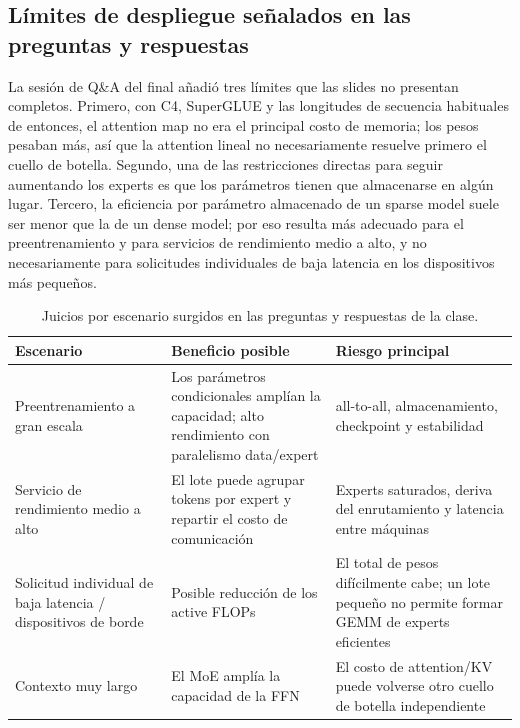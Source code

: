\documentclass[a4paper]{article}
\begin{document}
\subsection{Límites de despliegue señalados en las preguntas y respuestas}

La sesión de Q\&A del final añadió tres límites que las slides no presentan completos. Primero, con C4, SuperGLUE y las longitudes de secuencia habituales de entonces, el attention map no era el principal costo de memoria; los pesos pesaban más, así que la attention lineal no necesariamente resuelve primero el cuello de botella. Segundo, una de las restricciones directas para seguir aumentando los experts es que los parámetros tienen que almacenarse en algún lugar. Tercero, la eficiencia por parámetro almacenado de un sparse model suele ser menor que la de un dense model; por eso resulta más adecuado para el preentrenamiento y para servicios de rendimiento medio a alto, y no necesariamente para solicitudes individuales de baja latencia en los dispositivos más pequeños.

\begin{table}[H]
\centering
\small
\caption{Juicios por escenario surgidos en las preguntas y respuestas de la clase.}
\begin{tabularx}{\textwidth}{L{0.28\textwidth}X X}
\toprule
Escenario & Beneficio posible & Riesgo principal \\
\midrule
Preentrenamiento a gran escala & Los parámetros condicionales amplían la capacidad; alto rendimiento con paralelismo data/expert & all-to-all, almacenamiento, checkpoint y estabilidad \\
Servicio de rendimiento medio a alto & El lote puede agrupar tokens por expert y repartir el costo de comunicación & Experts saturados, deriva del enrutamiento y latencia entre máquinas \\
Solicitud individual de baja latencia / dispositivos de borde & Posible reducción de los active FLOPs & El total de pesos difícilmente cabe; un lote pequeño no permite formar GEMM de experts eficientes \\
Contexto muy largo & El MoE amplía la capacidad de la FFN & El costo de attention/KV puede volverse otro cuello de botella independiente \\
\bottomrule
\end{tabularx}
\end{table}

\end{document}
